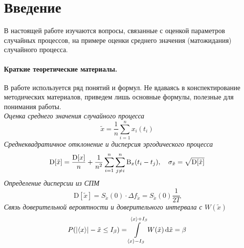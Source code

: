 \documentclass[a4paper,14pt]{extarticle}
\begin{document}


\tableofcontents
\newpage



\section*{Введение}
В настоящей работе изучаются вопросы, связанные с оценкой параметров случайных процессов, на примере оценки среднего значения (матожидания) случайного процесса.

\paragraph{Краткие теоретические материалы.} В работе используется ряд понятий и формул. Не вдаваясь в конспектирование методических материалов\footnotemark, приведем лишь основные формулы, полезные для понимания работы. \\[0.5em]
\textit{Оценка среднего значения случайного процесса}
\begin{equation}
     \tilde x = \frac{1}{n} \sum\limits_{i=1}^{n} x_i(t_i) 
 \end{equation} 
\textit{Среднеквадратичное отклонение и дисперсия эргодического процесса}
\begin{equation}
    \mathrm{D}\qty[\tilde x] = \frac{\mathrm{D}\qty[x]}{n} + \frac{1}{n^2} \sum\limits_{i=1}^{n} \sum\limits_{j\neq i}^{n} \mathrm{B}_x(t_i - t_j), \quad \sigma_{\tilde x} = \sqrt{\mathrm{D}\qty[\tilde x]}
\end{equation}
\textit{Определение дисперсии из СПМ}
\begin{equation}
    \mathrm{D}[\tilde x]=S_{\tilde x}(0)\cdot \Delta f_{\tilde x} = S_{\tilde x}(0) \frac{1}{2T}
\end{equation}
\textit{Связь доверительной вероятности и доверительного интервала с $W(\tilde x)$}
\begin{equation}
    P\qty(\abs{\langle x\rangle} - \tilde x \leq I_{\beta}) = \int\limits_{\langle x\rangle-I_{\beta}}^{\langle x\rangle+I_{\beta}}  W(\tilde x) \dd{\tilde x} = \beta
\end{equation}





\newpage
\end{document}
